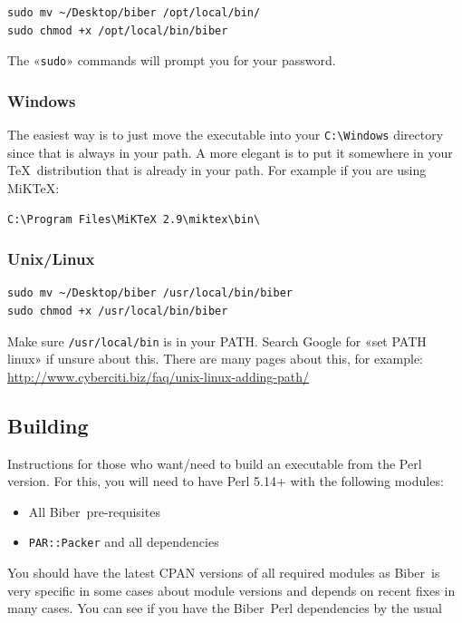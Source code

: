 \documentclass{ltxdockit}
\newcommand*{\biber}{Biber\xspace}
\begin{document}
\begin{verbatim}
sudo mv ~/Desktop/biber /opt/local/bin/
sudo chmod +x /opt/local/bin/biber
\end{verbatim}

\noindent The «\verb+sudo+» commands will prompt you for your password.

\subsubsection{Windows}

The easiest way is to just move the executable into your \verb+C:\Windows+ directory since
that is always in your path. A more elegant is to put it somewhere in
your \TeX\ distribution that is already in your path. For example if you
are using MiK\TeX:

\begin{verbatim}
C:\Program Files\MiKTeX 2.9\miktex\bin\
\end{verbatim}

\subsubsection{Unix/Linux}

\begin{verbatim}
sudo mv ~/Desktop/biber /usr/local/bin/biber
sudo chmod +x /usr/local/bin/biber
\end{verbatim}

\noindent Make sure \verb+/usr/local/bin+ is in your PATH. Search Google for «set PATH
linux» if unsure about this. There are many pages about this, for example:
\url{http://www.cyberciti.biz/faq/unix-linux-adding-path/}


\subsection{Building}

Instructions for those who want/need to build an executable from the
Perl version. For this, you will need to have Perl 5.14+ with
the following modules:

\begin{itemize}
\item All \biber\ pre-requisites
\item \verb+PAR::Packer+ and all dependencies
\end{itemize}

\noindent You should have the latest CPAN versions of all required modules
as \biber\ is very specific in some cases about module versions and
depends on recent fixes in many cases. You can see if you have the
\biber\ Perl dependencies by the usual
\end{document}
